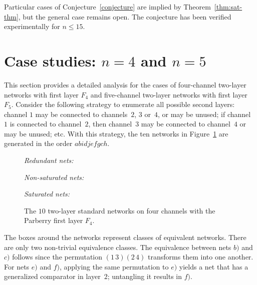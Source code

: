 \documentclass[10pt]{IEEEtran}
\begin{document}
Particular cases of Conjecture~\ref{conjecture} are implied by
Theorem~\ref{thm:sat-thm}, but the general case remains open. The
conjecture has been verified experimentally for $n\leq 15$.


\section{Case studies: $n=4$ and $n=5$}
\label{sec:example}

This section provides a detailed analysis for the cases of
four-channel two-layer networks with first layer $F_4$ and
five-channel two-layer networks with first layer $F_5$.
Consider the following strategy to enumerate all possible
second layers: channel $1$ may be connected to channels~$2$, $3$
or~$4$, or may be unused; if channel~$1$ is connected to channel~$2$,
then channel~$3$ may be connected to channel~$4$ or may be unused;
etc.  With this strategy, the ten networks in Figure~\ref{fig:4wire} are generated in
the order $\mathit{abidjefgch}$.

\begin{figure}
\smallskip\emph{Redundant nets:}\smallskip


\smallskip\emph{Non-saturated nets:}\smallskip


\smallskip
{}

\smallskip\emph{Saturated nets:}\smallskip

\bigskip

\caption{The $10$ two-layer standard networks on four channels with the Parberry first layer $F_4$.}
\label{fig:4wire}
\end{figure}

The boxes around the networks represent classes of
equivalent networks.  There are only two non-trivial equivalence
classes.
The equivalence between nets $b)$ and $c)$ follows since
the permutation $(1\,3)(2\,4)$ transforms them into one another.  For
nets $e)$ and $f)$, applying the same permutation to $e)$ yields a net
that has a generalized comparator in layer~$2$; untangling it results in
$f)$.
\end{document}
